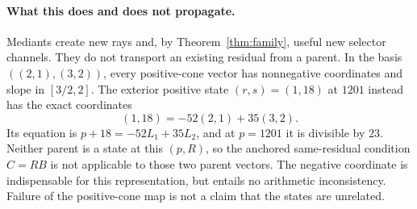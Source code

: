 \documentclass[11pt]{article}
\theoremstyle{remark}\newtheorem{remark}[theorem]{Remark}
\begin{document}
\paragraph{What this does and does not propagate.}
Mediants create new rays and, by Theorem~\ref{thm:family}, useful new selector channels. They do not transport an existing residual from a parent. In the basis $((2,1),(3,2))$, every positive-cone vector has nonnegative coordinates and slope in $[3/2,2]$. The exterior positive state $(r,s)=(1,18)$ at $1201$ instead has the exact coordinates
\[
 (1,18)=-52(2,1)+35(3,2).
\]
Its equation is $p+18=-52L_1+35L_2$, and at $p=1201$ it is divisible by $23$. Neither parent is a state at this $(p,R)$, so the anchored same-residual condition $C=RB$ is not applicable to those two parent vectors. The negative coordinate is indispensable for this representation, but entails no arithmetic inconsistency. Failure of the positive-cone map is not a claim that the states are unrelated.
\end{document}
